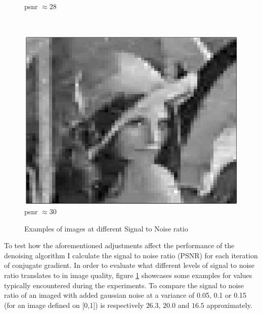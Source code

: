 \documentclass{article}
\begin{document}
\begin{figure}[h]
{\begin{minipage}[b]{0.25\textwidth}
				\small{psnr $\approx 28$}
				\label{psnr_28}
		\end{minipage}%
		~ %
		\begin{minipage}[b]{0.25\textwidth}
                \centering
				\includegraphics[width=\textwidth]{img/img_30_psnr}
				\small{psnr $\approx 30$}
				\label{psnr_30}
		\end{minipage}%
	}%
		\caption{Examples of images at different Signal to Noise ratio}
		\label{img_examples}
\end{figure}

To test how the aforementioned adjustments affect the performance of the 
denoising algorithm I calculate the signal to noise ratio (PSNR) for 
each iteration of conjugate gradient. In order to evaluate what 
different levels of signal to noise ratio translates to in image 
quality, figure \ref{img_examples} showcases some examples for values 
typically encountered during the experiments. To compare the signal to 
noise ratio of an imaged with added gaussian noise at a variance of 
0.05, 0.1 or 0.15  (for an image defined on [0,1]) is respectively 
$26.3, \, 20.0$ and $16.5$ approximately. 
\end{document}
